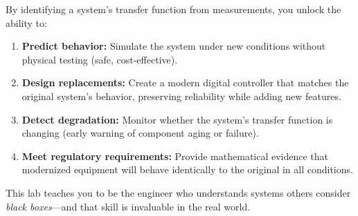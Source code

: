 \documentclass[11pt,letterpaper]{article}
\begin{document}
By identifying a system's transfer function from measurements, you unlock the ability to:
\begin{enumerate}
    \item \textbf{Predict behavior:} Simulate the system under new conditions without physical testing (safe, cost-effective).
    \item \textbf{Design replacements:} Create a modern digital controller that matches the original system's behavior, preserving reliability while adding new features.
    \item \textbf{Detect degradation:} Monitor whether the system's transfer function is changing (early warning of component aging or failure).
    \item \textbf{Meet regulatory requirements:} Provide mathematical evidence that modernized equipment will behave identically to the original in all conditions.
\end{enumerate}

This lab teaches you to be the engineer who understands systems others consider \textit{black boxes}—and that skill is invaluable in the real world.
\end{document}
